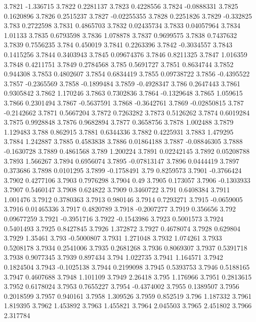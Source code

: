 3.7821  -1.336715
3.7822  0.2281137
3.7823  0.4228556
3.7824  -0.0888331
3.7825  0.1620896
3.7826  0.2515237
3.7827  -0.02255355
3.7828  0.2251826
3.7829  -0.332825
3.783  0.2722598
3.7831  0.4865703
3.7832  0.02435734
3.7833  0.04057964
3.7834  1.01133
3.7835  0.6793598
3.7836  1.078878
3.7837  0.9699575
3.7838  0.7437632
3.7839  0.7556235
3.784  0.450019
3.7841  0.2263396
3.7842  -0.3034557
3.7843  0.1415256
3.7844  0.3403943
3.7845  0.09674376
3.7846  0.8211325
3.7847  1.016359
3.7848  0.4211751
3.7849  0.2784568
3.785  0.5691727
3.7851  0.8634744
3.7852  0.944308
3.7853  0.4802607
3.7854  0.6834419
3.7855  0.09738722
3.7856  -0.4395522
3.7857  -0.2365569
3.7858  -0.1899484
3.7859  -0.4928347
3.786  0.2647443
3.7861  0.9305842
3.7862  1.170246
3.7863  0.7302836
3.7864  -0.1329648
3.7865  1.059615
3.7866  0.2301494
3.7867  -0.5637591
3.7868  -0.3642761
3.7869  -0.02850815
3.787  -0.2142662
3.7871  0.5667204
3.7872  0.7263282
3.7873  0.5126262
3.7874  0.6019284
3.7875  0.9928848
3.7876  0.9682894
3.7877  0.3658756
3.7878  1.002488
3.7879  1.129483
3.788  0.862915
3.7881  0.6344336
3.7882  0.4225931
3.7883  1.479295
3.7884  1.242887
3.7885  0.4583838
3.7886  0.01864188
3.7887  -0.08846305
3.7888  -0.1630728
3.7889  0.4861568
3.789  1.200224
3.7891  0.02242145
3.7892  0.05208788
3.7893  1.566267
3.7894  0.6956074
3.7895  -0.07813147
3.7896  0.0444419
3.7897  0.373686
3.7898  0.0101295
3.7899  -0.1758491
3.79  0.8259573
3.7901  -0.3766424
3.7902  0.4277106
3.7903  0.7976298
3.7904  0.49
3.7905  0.173057
3.7906  -0.1303933
3.7907  0.5460147
3.7908  0.624822
3.7909  0.3460722
3.791  0.6408384
3.7911  1.001476
3.7912  0.3780363
3.7913  0.980146
3.7914  0.7293271
3.7915  -0.0659005
3.7916  0.01465336
3.7917  0.4820789
3.7918  -0.2007277
3.7919  0.356656
3.792  0.09677259
3.7921  -0.3951716
3.7922  -0.1543986
3.7923  0.5001573
3.7924  0.5401493
3.7925  0.8427845
3.7926  1.372872
3.7927  0.4678074
3.7928  0.629804
3.7929  1.35461
3.793  -0.5000807
3.7931  1.271048
3.7932  1.074261
3.7933  0.5208178
3.7934  0.2541006
3.7935  0.2681268
3.7936  0.8069307
3.7937  0.5391718
3.7938  0.9077345
3.7939  0.897434
3.794  1.022735
3.7941  1.164571
3.7942  0.1824504
3.7943  -0.1025138
3.7944  0.2199098
3.7945  0.5393753
3.7946  0.5188165
3.7947  0.4607688
3.7948  1.101109
3.7949  2.26418
3.795  1.176966
3.7951  0.2813615
3.7952  0.6178024
3.7953  0.7655227
3.7954  -0.4374002
3.7955  0.1389507
3.7956  0.2018599
3.7957  0.940161
3.7958  1.309526
3.7959  0.852519
3.796  1.187332
3.7961  1.819395
3.7962  1.453892
3.7963  1.455821
3.7964  2.045503
3.7965  2.451802
3.7966  2.317784
